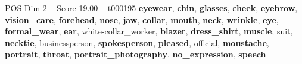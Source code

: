 \begin{textsample}{POS Dim 2 – Score 19.00 – t000195}  \label{ex:f2_pos_036}
\textbf{eyewear}, \textbf{chin}, \textbf{glasses}, \textbf{cheek}, \textbf{eyebrow}, \textbf{vision\_care}, \textbf{forehead}, \textbf{nose}, \textbf{jaw}, \textbf{collar}, \textbf{mouth}, \textbf{neck}, \textbf{wrinkle}, \textbf{eye}, \textbf{formal\_wear}, \textbf{ear}, white-collar\_worker, \textbf{blazer}, \textbf{dress\_shirt}, \textbf{muscle}, suit, \textbf{necktie}, businessperson, \textbf{spokesperson}, \textbf{pleased}, official, \textbf{moustache}, \textbf{portrait}, \textbf{throat}, \textbf{portrait\_photography}, \textbf{no\_expression}, \textbf{speech}

\end{textsample}
